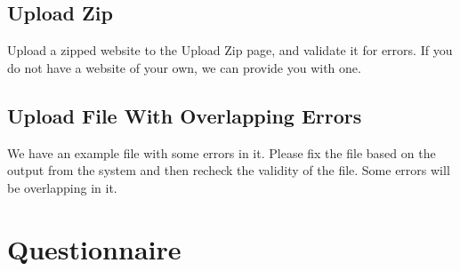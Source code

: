 \documentclass[11pt]{article}
\begin{document}
\subsection*{Upload Zip}

Upload a zipped website to the Upload Zip page, and validate it for errors. If you do not have a website of your own, we can provide you with one.

\subsection*{Upload File With Overlapping Errors}

We have an example file with some errors in it. Please fix the file based on the output from the system and then recheck the validity of the file. Some errors will be overlapping in it.

\section*{Questionnaire}
\end{document}

